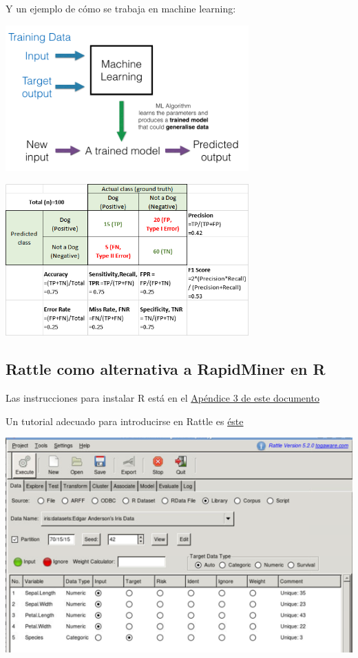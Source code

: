 \documentclass[
]{book}
\begin{document}
Y un ejemplo de cómo se trabaja en machine learning:

\includegraphics[width=0.7\textwidth,height=\textheight]{images/T3-Supervised_ML.png}

\includegraphics[width=0.7\textwidth,height=\textheight]{images/T3-ML-indicadores.png}

\hypertarget{rattle-como-alternativa-a-rapidminer-en-r}{%
\subsection{Rattle como alternativa a RapidMiner en R}\label{rattle-como-alternativa-a-rapidminer-en-r}}

Las instrucciones para instalar R está en el \href{https://gltaboada.github.io/tgdbook/instalaci\%C3\%B3n-de-r.html}{Apéndice 3 de este documento}

Un tutorial adecuado para introducirse en Rattle es \href{https://www.dummies.com/programming/using-rattle-iris-r-programming/}{éste}

\includegraphics{images/T3-rattle1.png}
\end{document}
